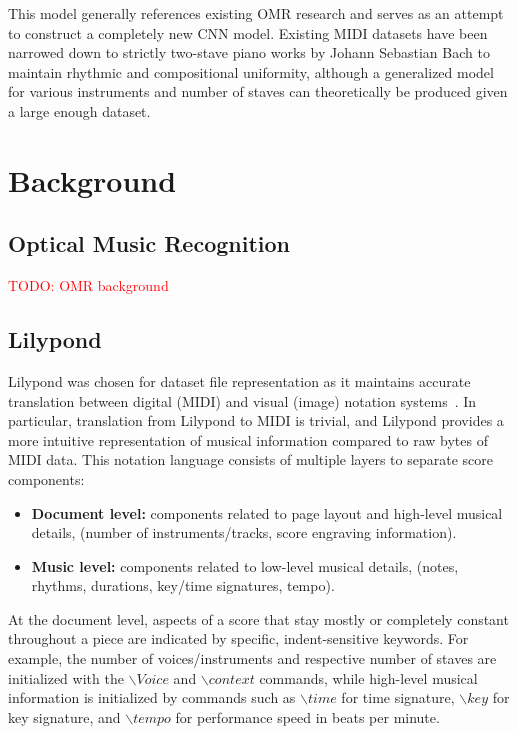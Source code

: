 \documentclass[review,sigconf]{acmart}
\newcommand{\todo}[1]{\textcolor{red}{TODO: #1}}
\begin{document}
This model generally references existing OMR research and serves as an attempt to construct a completely new CNN model. Existing MIDI datasets have been narrowed down to strictly two-stave piano works by Johann Sebastian Bach to maintain rhythmic and compositional uniformity, although a generalized model for various instruments and number of staves can theoretically be produced given a large enough dataset.


\section{Background}
\subsection{Optical Music Recognition}
\todo{OMR background}

\subsection{Lilypond}
Lilypond was chosen for dataset file representation as it maintains accurate translation between digital (MIDI) and visual (image) notation systems~\cite{lilypond}.
In particular, translation from Lilypond to MIDI is trivial, and Lilypond provides a more intuitive representation of musical information compared to raw bytes of MIDI data.
This notation language consists of multiple layers to separate score components:

\begin{itemize}
		\item \textbf{Document level:} components related to page layout and high-level musical details, (number of instruments/tracks, score engraving information).
		\item \textbf{Music level:} components related to low-level musical details, (notes, rhythms, durations, key/time signatures, tempo).
\end{itemize}

At the document level, aspects of a score that stay mostly or completely constant throughout a piece are indicated by specific, indent-sensitive keywords.
For example, the number of voices/instruments and respective number of staves are initialized with the $\backslash{Voice}$ and $\backslash{context}$ commands,
while high-level musical information is initialized by commands such as $\backslash{time}$ for time signature, $\backslash{key}$ for key signature, and $\backslash{tempo}$ for performance speed in beats per minute.  
\end{document}
